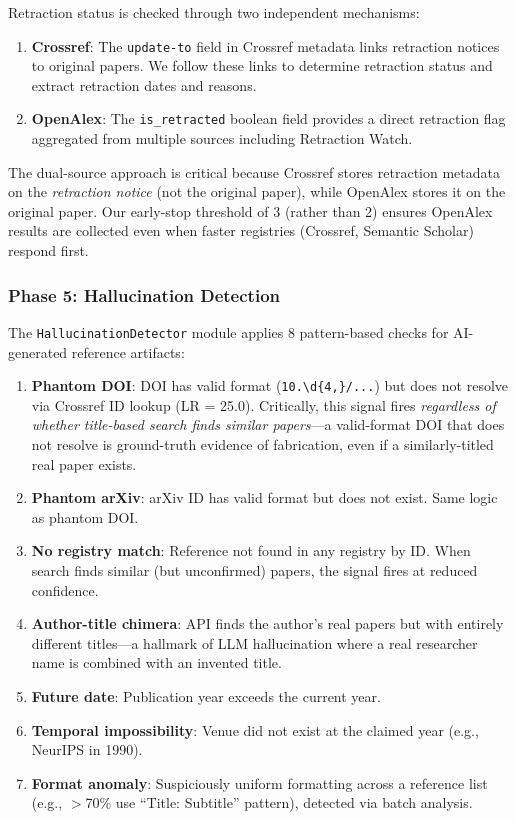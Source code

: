 \documentclass[sigconf,nonacm]{acmart}
\begin{document}
Retraction status is checked through two independent mechanisms:
\begin{enumerate}
    \item \textbf{Crossref}: The \texttt{update-to} field in Crossref metadata links retraction notices to original papers. We follow these links to determine retraction status and extract retraction dates and reasons.
    \item \textbf{OpenAlex}: The \texttt{is\_retracted} boolean field provides a direct retraction flag aggregated from multiple sources including Retraction Watch.
\end{enumerate}

The dual-source approach is critical because Crossref stores retraction metadata on the \emph{retraction notice} (not the original paper), while OpenAlex stores it on the original paper.
Our early-stop threshold of 3 (rather than 2) ensures OpenAlex results are collected even when faster registries (Crossref, Semantic Scholar) respond first.

\subsubsection{Phase 5: Hallucination Detection}

The \texttt{HallucinationDetector} module applies 8 pattern-based checks for AI-generated reference artifacts:

\begin{enumerate}[leftmargin=*]
    \item \textbf{Phantom DOI}: DOI has valid format (\texttt{10.\textbackslash d\{4,\}/...}) but does not resolve via Crossref ID lookup (LR = 25.0). Critically, this signal fires \emph{regardless of whether title-based search finds similar papers}---a valid-format DOI that does not resolve is ground-truth evidence of fabrication, even if a similarly-titled real paper exists.
    \item \textbf{Phantom arXiv}: arXiv ID has valid format but does not exist. Same logic as phantom DOI.
    \item \textbf{No registry match}: Reference not found in any registry by ID. When search finds similar (but unconfirmed) papers, the signal fires at reduced confidence.
    \item \textbf{Author-title chimera}: API finds the author's real papers but with entirely different titles---a hallmark of LLM hallucination where a real researcher name is combined with an invented title.
    \item \textbf{Future date}: Publication year exceeds the current year.
    \item \textbf{Temporal impossibility}: Venue did not exist at the claimed year (e.g., NeurIPS in 1990).
    \item \textbf{Format anomaly}: Suspiciously uniform formatting across a reference list (e.g., $>$70\% use ``Title: Subtitle'' pattern), detected via batch analysis.
\end{enumerate}
\end{document}
